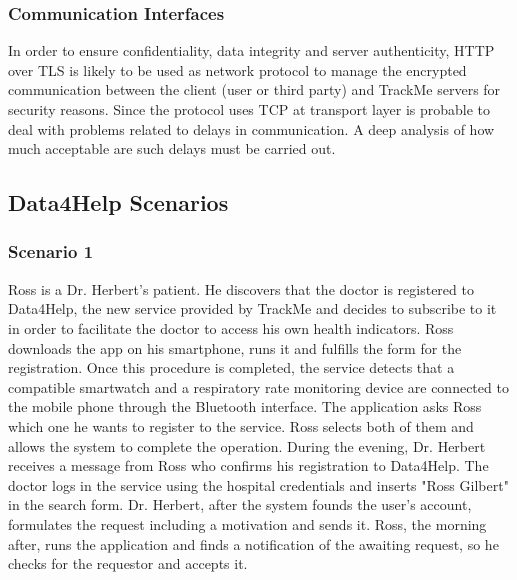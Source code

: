 {\color{Blue}\subsubsection{Communication Interfaces}}
In order to ensure confidentiality, data integrity and server authenticity, HTTP over TLS is likely to be used as network protocol to manage the encrypted communication between the client (user or third party) and TrackMe servers for security reasons. Since the protocol uses TCP at transport layer is probable to deal with problems related to delays in communication. A deep analysis of how much acceptable are such delays must be carried out.

{\color{Blue}\subsection{Data4Help Scenarios}}
{\color{Blue}\subsubsection{Scenario 1}}

Ross is a Dr. Herbert's patient. He discovers that the doctor is registered to Data4Help, the new service provided by TrackMe and decides to subscribe to it in order to facilitate the doctor to access his own health indicators. Ross downloads the app on his smartphone, runs it and fulfills the form for the registration. Once this procedure is completed, the service detects that a compatible smartwatch and a respiratory rate monitoring device are connected to the mobile phone through the Bluetooth interface. The application asks Ross which one he wants to register to the service. Ross selects both of them and allows the system to complete the operation.
During the evening, Dr. Herbert receives a message from Ross who confirms his registration to Data4Help. The doctor logs in the service using the hospital credentials and inserts "Ross Gilbert" in the search form. Dr. Herbert, after the system founds the user's account, formulates the request including a motivation and sends it. Ross, the morning after, runs the application and finds a notification of the awaiting request, so he checks for the requestor and accepts it.  



